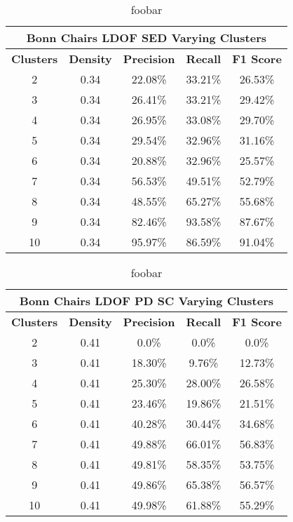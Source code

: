 \begin{table}[H]
\centering
\begin{tabular}{|c|c|c|c|c|}
\hline
\multicolumn{5}{|c|}{Bonn Chairs LDOF SED Varying Clusters}                        \\ \hline
\textbf{Clusters} & \textbf{Density} & \textbf{Precision} & \textbf{Recall} & \textbf{F1 Score} \\ \hline
2 & 0.34 & 22.08\%   & 33.21\%     & 26.53\%  \\ \hline
3 & 0.34 & 26.41\%   & 33.21\%     & 29.42\%  \\ \hline
4 & 0.34 & 26.95\%   & 33.08\%     & 29.70\%  \\ \hline
5 & 0.34 & 29.54\%   & 32.96\%     & 31.16\%  \\ \hline
6 & 0.34 & 20.88\%   & 32.96\%     & 25.57\%  \\ \hline
7 & 0.34 & 56.53\%   & 49.51\%     & 52.79\%  \\ \hline
8 & 0.34 & 48.55\%   & 65.27\%     & 55.68\%  \\ \hline
9 & 0.34 & 82.46\%   & 93.58\%     & 87.67\%  \\ \hline              
10 & 0.34 & 95.97\%   & 86.59\%     & 91.04\%  \\ \hline
\end{tabular}
\caption[Bonn Chairs SED Varying Clusters]{foobar}
\label{tab:bonn_chairs_ldof_sed_c_6_9_10_eval}
\end{table}

\begin{table}[H]
\centering
\begin{tabular}{|c|c|c|c|c|}
\hline
\multicolumn{5}{|c|}{Bonn Chairs LDOF PD SC Varying Clusters}                        \\ \hline
\textbf{Clusters} & \textbf{Density} & \textbf{Precision} & \textbf{Recall} & \textbf{F1 Score} \\ \hline
2 & 0.41 & 0.0\%   & 0.0\%     & 0.0\%  \\ \hline
3 & 0.41 & 18.30\%   & 9.76\%     & 12.73\%  \\ \hline
4 & 0.41 & 25.30\%   & 28.00\%     & 26.58\%  \\ \hline
5 & 0.41 & 23.46\%   & 19.86\%     & 21.51\%  \\ \hline
6 & 0.41 & 40.28\%   & 30.44\%     & 34.68\%  \\ \hline
7 & 0.41 & 49.88\%   & 66.01\%     & 56.83\%  \\ \hline
8 & 0.41 & 49.81\%   & 58.35\%     & 53.75\%  \\ \hline
9 & 0.41 & 49.86\%   & 65.38\%     & 56.57\%  \\ \hline              
10 & 0.41 & 49.98\%   & 61.88\%     & 55.29\%  \\ \hline
\end{tabular}
\caption[Bonn Chairs PD SC Varying Clusters]{foobar}
\label{tab:bonn_chairs_ldof_sed_c_6_9_10_eval_pd_sc}
\end{table}

